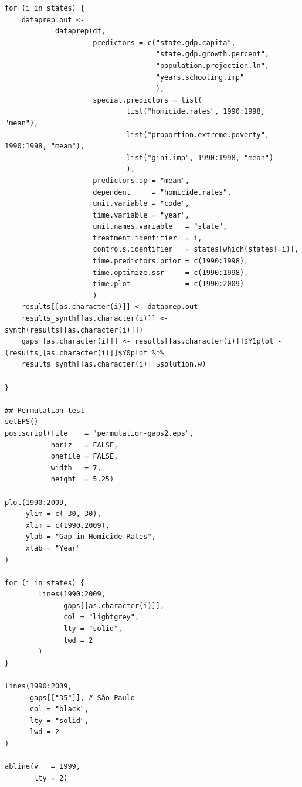 \begin{verbatim}
for (i in states) {
    dataprep.out <-
            dataprep(df,
                     predictors = c("state.gdp.capita",
                                    "state.gdp.growth.percent",
                                    "population.projection.ln",
                                    "years.schooling.imp"
                                    ),
                     special.predictors = list(
                             list("homicide.rates", 1990:1998, "mean"),
                             list("proportion.extreme.poverty", 1990:1998, "mean"),
                             list("gini.imp", 1990:1998, "mean")
                             ),
                     predictors.op = "mean",
                     dependent     = "homicide.rates",
                     unit.variable = "code",
                     time.variable = "year",
                     unit.names.variable   = "state",
                     treatment.identifier  = i,
                     controls.identifier   = states[which(states!=i)],
                     time.predictors.prior = c(1990:1998),
                     time.optimize.ssr     = c(1990:1998),
                     time.plot             = c(1990:2009)
                     )
    results[[as.character(i)]] <- dataprep.out
    results_synth[[as.character(i)]] <- synth(results[[as.character(i)]])
    gaps[[as.character(i)]] <- results[[as.character(i)]]$Y1plot - (results[[as.character(i)]]$Y0plot %*%
    results_synth[[as.character(i)]]$solution.w)

}

## Permutation test
setEPS()
postscript(file    = "permutation-gaps2.eps",
           horiz   = FALSE,
           onefile = FALSE,
           width   = 7,
           height  = 5.25)

plot(1990:2009,
     ylim = c(-30, 30),
     xlim = c(1990,2009),
     ylab = "Gap in Homicide Rates",
     xlab = "Year"
)

for (i in states) {
        lines(1990:2009,
              gaps[[as.character(i)]],
              col = "lightgrey",
              lty = "solid",
              lwd = 2
        )
}

lines(1990:2009,
      gaps[["35"]], # São Paulo
      col = "black",
      lty = "solid",
      lwd = 2
)

abline(v   = 1999,
       lty = 2)
\end{verbatim}

\newpage 

